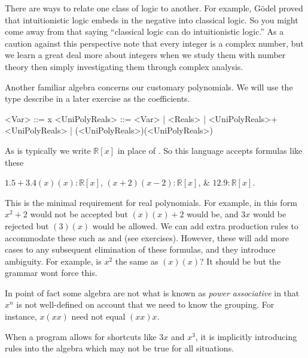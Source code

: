 \begin{remark}
    There are ways to relate one class of logic to another. 
    For example, G\"odel proved that intuitionistic logic embeds
    in the negative into classical logic.  So you 
    might come away from that saying ``classical logic can do 
    intuitionistic logic.''   As a caution against this perspective note that every integer is 
    a complex number, but we learn a great deal more about integers when we 
    study them with number theory then simply investigating them 
    through complex analysis. 
\end{remark}


Another familiar algebra concerns our customary polynomials.  We will use 
the type  describe in a later exercise as the coefficients.
\begin{Gcode}[]
    <Var>  ::= x 
    <UniPolyReals> ::= <Var>
            | <Reals>
            | <UniPolyReals>+<UniPolyReals>
            | (<UniPolyReals>)(<UniPolyReals>)
\end{Gcode}
As is typically  we write $\mathbb{R}[x]$ in place 
of .  So this language accepts formulas like these 
\begin{center}
    $1.5+3.4(x)(x):\mathbb{R}[x]$,
    $(x+2)(x-2):\mathbb{R}[x]$, \&
    $12.9:\mathbb{R}[x]$.
\end{center}
This is the minimal requirement for real polynomials.
For example, in this form $x^2+2$ would not be accepted but 
$(x)(x)+2$ would be, and $3x$ would be rejected but $(3)(x)$ would 
be allowed.  We can add extra production rules to accommodate these 
such as  and  (see exercises).  However, 
these will add more cases to any subsequent elimination of these formulas,
and they introduce ambiguity.  For example, is $x^2$ the same as $(x)(x)$?
It should be but the grammar wont force this.

\begin{remark}
    In point of fact some algebra are not what is known as 
    \emph{power associative} in that $x^n$ is not well-defined 
    on account that we need to know the grouping.  For instance,
    $x(xx)$ need not equal $(xx)x$.

    When a program allows for shortcuts like $3x$ and $x^3$, it is 
    implicitly introducing rules into the algebra which may not be true 
    for all situations.
\end{remark}

